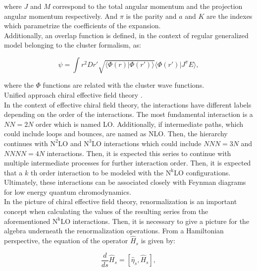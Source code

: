 \documentclass[openany]{book}
\begin{document}
where $J$ and $M$ correspond to the total angular momentum and the projection angular momentum respectively. And $\pi$ is the parity and $a$ and $K$ are the indexes which parametrize the coefficients of the expansion.  \\

Additionally, an overlap function is defined, in the context of regular generalized model belonging to the cluster formalism,  as: 


\begin{equation} \label{eq:micro_FMD_overlap}
	\psi = \int r^2 Dr' \sqrt{\langle \Phi(r) | \Phi(r') \rangle } \langle \Phi(r') | J^{\pi} E \rangle,
\end{equation}

where the $\Phi$ functions are related with the cluster wave functions. \\

Unified approach chiral effective field theory  \cite{navratil_quaglioni_hupin_romero-redondo_calci_2016}. \\

In the context of effective chiral field theory, the interactions have different labels depending on the order of the interactions. The most fundamental interaction is a $NN = 2N$ order which is named LO. Additionally, if intermediate paths, which could include loops and bounces, are named as $\mathrm{NLO}$. Then, the hierarchy continues with $\mathrm{N^2LO}$ and $\mathrm{N^3LO}$ interactions which could include $NNN = 3N$ and $NNNN = 4N$ interactions. Then, it is expected this series to continue with multiple intermediate processes for further interaction order.  Then, it is expected that a $k$ th order interaction to be modeled with the $\mathrm{N^kLO}$ configurations. Ultimately, these interactions can be associated closely with Feynman diagrams for low energy quantum chromodynamics. \\

In the picture of chiral effective field theory, renormalization is an important concept when calculating the values of the resulting series from the aforementioned $\mathrm{N^kLO}$ interactions. Then, it is necessary to give a picture for the algebra underneath the renormalization operations. From a Hamiltonian perspective, the equation of the operator $\hat H_s$ is given by: 

\begin{equation}\label{eq:micro_EFT_evolution}
	\frac{d}{ds}\hat H_s = [\hat \eta_s, \hat H_s],
\end{equation}
\end{document}
